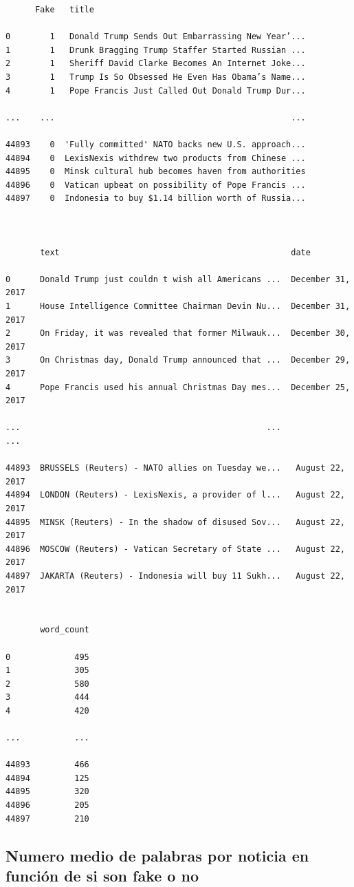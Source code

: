 \documentclass[
  11pt,
  a4paper,
]{article}
\begin{document}
\begin{verbatim}
      Fake   title        
      
0        1   Donald Trump Sends Out Embarrassing New Year’...   
1        1   Drunk Bragging Trump Staffer Started Russian ...   
2        1   Sheriff David Clarke Becomes An Internet Joke...   
3        1   Trump Is So Obsessed He Even Has Obama’s Name...   
4        1   Pope Francis Just Called Out Donald Trump Dur...

...    ...                                                ...   

44893    0  'Fully committed' NATO backs new U.S. approach...   
44894    0  LexisNexis withdrew two products from Chinese ...   
44895    0  Minsk cultural hub becomes haven from authorities   
44896    0  Vatican upbeat on possibility of Pope Francis ...   
44897    0  Indonesia to buy $1.14 billion worth of Russia...   



       text                                               date               
       
0      Donald Trump just couldn t wish all Americans ...  December 31, 2017   
1      House Intelligence Committee Chairman Devin Nu...  December 31, 2017   
2      On Friday, it was revealed that former Milwauk...  December 30, 2017   
3      On Christmas day, Donald Trump announced that ...  December 29, 2017   
4      Pope Francis used his annual Christmas Day mes...  December 25, 2017   

...                                                  ...                ...   

44893  BRUSSELS (Reuters) - NATO allies on Tuesday we...   August 22, 2017    
44894  LONDON (Reuters) - LexisNexis, a provider of l...   August 22, 2017    
44895  MINSK (Reuters) - In the shadow of disused Sov...   August 22, 2017    
44896  MOSCOW (Reuters) - Vatican Secretary of State ...   August 22, 2017    
44897  JAKARTA (Reuters) - Indonesia will buy 11 Sukh...   August 22, 2017    


       word_count
       
0             495  
1             305  
2             580  
3             444  
4             420  

...           ...  

44893         466  
44894         125  
44895         320  
44896         205  
44897         210  
\end{verbatim}

\hypertarget{numero-medio-de-palabras-por-noticia-en-funciuxf3n-de-si-son-fake-o-no}{%
\subsection{Numero medio de palabras por noticia en función de si son
fake o
no}\label{numero-medio-de-palabras-por-noticia-en-funciuxf3n-de-si-son-fake-o-no}}
\end{document}
